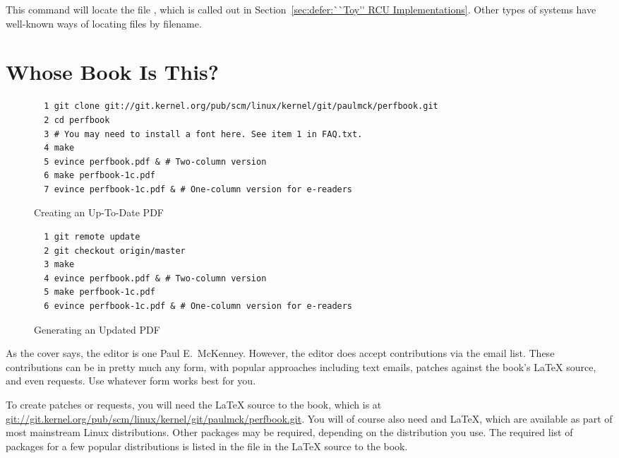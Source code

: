 This command will locate the file , which is called out in
Section~\ref{sec:defer:``Toy'' RCU Implementations}.
Other types of systems have well-known ways of locating files by filename.

\section{Whose Book Is This?}
\label{sec:howto:Whose Book Is This?}

\begin{figure*}[tbp]
{
\scriptsize
\begin{verbatim}
  1 git clone git://git.kernel.org/pub/scm/linux/kernel/git/paulmck/perfbook.git
  2 cd perfbook
  3 # You may need to install a font here. See item 1 in FAQ.txt.
  4 make
  5 evince perfbook.pdf & # Two-column version
  6 make perfbook-1c.pdf
  7 evince perfbook-1c.pdf & # One-column version for e-readers
\end{verbatim}
}
\caption{Creating an Up-To-Date PDF}
\label{fig:howto:Creating a Up-To-Date PDF}
\end{figure*}

\begin{figure*}[tbp]
{
\scriptsize
\begin{verbatim}
  1 git remote update
  2 git checkout origin/master
  3 make
  4 evince perfbook.pdf & # Two-column version
  5 make perfbook-1c.pdf
  6 evince perfbook-1c.pdf & # One-column version for e-readers
\end{verbatim}
}
\caption{Generating an Updated PDF}
\label{fig:howto:Generating an Updated PDF}
\end{figure*}

As the cover says, the editor is one Paul E.~McKenney.
However, the editor does accept contributions via the
 email list.
These contributions can be in pretty much any form, with popular
approaches including text emails,
patches against the book's \LaTeX{} source, and even  requests.
Use whatever form works best for you.

To create patches or  requests, you will need the
\LaTeX{} source to the book, which is at
\url{git://git.kernel.org/pub/scm/linux/kernel/git/paulmck/perfbook.git}.
You will of course also need  and \LaTeX{}, which are
available as part of most mainstream Linux distributions.
Other packages may be required, depending on the distribution you use.
The required list of packages for a few popular distributions is listed
in the file  in the \LaTeX{} source to the book.

